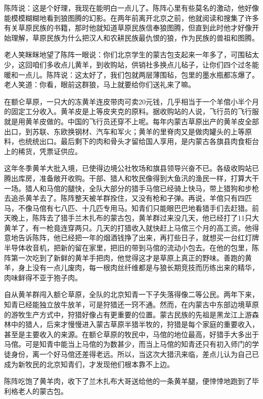 \par 陈阵说：这是个好理，我现在能明白一点儿了。陈阵心里有些莫名的激动，他好像能模模糊糊地看到狼图腾的幻影。在两年前离开北京之前，他就阅读和搜集了许多有关草原民族的书籍，那时他就知道草原民族信奉狼图腾，但直到此时他才好像开始理解，草原民族为什么把汉人和农耕民族最仇恨的狼，作为民族的兽祖和图腾。
\par 老人笑眯眯地望了陈阵一眼说：你们北京学生的蒙古包支起来一年多了，可围毡太少，这回咱们多收点儿黄羊，到收购站，供销社多换点儿毡子，让你们四个过冬能暖和一点儿。陈阵说：这太好了，我们包就两层薄围毡，包里的墨水瓶都冻爆了。老人笑道：你看，眼前这群狼，马上就要给你们送礼来了嘛。
\par 在额仑草原，一只大的冻黄羊连皮带肉可卖20元钱，几乎相当于一个羊倌小半个月的固定工分收入。黄羊皮是上等皮夹克的原料。据收购站的人说，飞行员的飞行服就是用黄羊皮做的。中国的飞行员还穿不上呢。每年内蒙古草原出产的黄羊皮全部出口，到苏联、东欧换钢材、汽车和军火；黄羊的里脊肉又是做肉罐头的上等原料，也统统出口。最后剩下的肉和骨头才留给国人享用，是内蒙古各旗县肉食柜台上的稀货，凭票证供应。
\par 这年冬季黄羊大批入境，已使得边境公社牧场和旗县领导兴奋不已。各级收购站已腾出库房，准备敞开收购。干部、猎人和牧民像得到大鱼汛的渔民一样，打算大干一场。猎人和马倌的腿快，全队大部分的猎手马倌已经骑上快马，带上猎狗和步枪去追杀黄羊去了。陈阵整天被羊群拴住，又没有枪和子弹。再说，羊倌只有四匹马，不像马倌有七八匹、十几匹专用马。知青们只能眼巴巴地看猎手们去赶猎。前天晚上，陈阵去了猎手兰木扎布的蒙古包，黄羊群过来没几天，他已经打了11只大黄羊了，有一枪竟连穿两只。几天的打猎收入就快赶上马倌三个月的高工资。他得意地告诉陈阵，他已经把一年的烟酒钱挣了出来，再打些日子，就想买一台红灯牌半导体收音机，把新的留在家里，把旧的带到马倌的流动小包去。在他的包里，陈阵第一次吃到了新鲜的黄羊手把肉，他觉得这才是草原上真正的野味。善跑的黄羊，身上没有一点儿废肉，每一根肉丝纤维都是与狼长期竞技而历练出来的精华，肉味鲜得不亚于狍子肉。
\par 自从黄羊群闯入额仑草原，全队的北京知青一下子失落得像二等公民。两年下来，知青已经能独立放牛放羊，可是狩猎还一窍不通。然而，在内蒙古中东部边境草原的游牧生产方式中，狩猎好像占有更重要的位置。蒙古民族的先祖是黑龙江上游森林中的猎人，后来才慢慢进入蒙古草原半猎半牧的，狩猎是每个家庭的重要收入，甚至是主要收入的来源。在额仑草原的牧民中，马倌的地位最高，好猎手大多出于马倌。可是知青中能当上马倌的为数甚少，而当上马倌的知青还只有初入师门的学徒身份，离一个好马倌还差得老远。所以，当这次大猎汛来临，差点儿认为自己已成为新牧民的北京知青们，才发现他们根本靠不上边。
\par 陈阵吃饱了黄羊肉，收下了兰木扎布大哥送给他的一条黄羊腿，便悻悻地跑到了毕利格老人的蒙古包。
